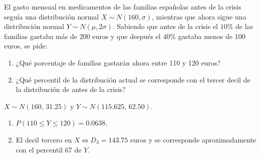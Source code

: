 {El gasto mensual en medicamentos de las familias españolas antes de la crisis seguía una distribución normal $X\sim
N(160,\sigma)$, mientras que ahora sigue una distribución normal $Y\sim N(\mu,2\sigma)$.
Sabiendo que antes de la crisis el $10\%$ de las familias gastaba más de 200 euros y que después el $40\%$ gastaba
menos de 100 euros, se pide:
\begin{enumerate}
\item ¿Qué porcentaje de familias gastarán ahora entre 110 y 120 euros?
\item ¿Qué percentil de la distribución actual se corresponde con el tercer decil de la distribución de antes de la crisis?
\end{enumerate}
}
{$X\sim N(160,\,31.25)$ y $Y\sim N(115.625,\,62.50)$.
\begin{enumerate}
\item $P(110\leq Y\leq 120)=0.0638$.
\item El decil tercero en $X$ es $D_3=143.75$ euros y se corresponde aproximadamente con el percentil 67 de $Y$. 
\end{enumerate}
}
